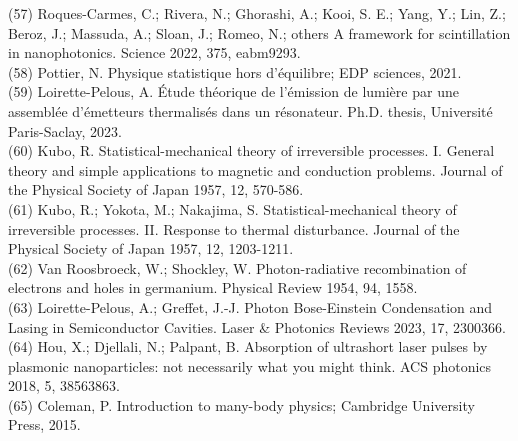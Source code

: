 \documentclass[10pt]{article}
\begin{document}
(57) Roques-Carmes, C.; Rivera, N.; Ghorashi, A.; Kooi, S. E.; Yang, Y.; Lin, Z.; Beroz, J.; Massuda, A.; Sloan, J.; Romeo, N.; others A framework for scintillation in nanophotonics. Science 2022, 375, eabm9293.\\
(58) Pottier, N. Physique statistique hors d'équilibre; EDP sciences, 2021.\\
(59) Loirette-Pelous, A. Étude théorique de l'émission de lumière par une assemblée d'émetteurs thermalisés dans un résonateur. Ph.D. thesis, Université Paris-Saclay, 2023.\\
(60) Kubo, R. Statistical-mechanical theory of irreversible processes. I. General theory and simple applications to magnetic and conduction problems. Journal of the Physical Society of Japan 1957, 12, 570-586.\\
(61) Kubo, R.; Yokota, M.; Nakajima, S. Statistical-mechanical theory of irreversible processes. II. Response to thermal disturbance. Journal of the Physical Society of Japan 1957, 12, 1203-1211.\\
(62) Van Roosbroeck, W.; Shockley, W. Photon-radiative recombination of electrons and holes in germanium. Physical Review 1954, 94, 1558.\\
(63) Loirette-Pelous, A.; Greffet, J.-J. Photon Bose-Einstein Condensation and Lasing in Semiconductor Cavities. Laser \& Photonics Reviews 2023, 17, 2300366.\\
(64) Hou, X.; Djellali, N.; Palpant, B. Absorption of ultrashort laser pulses by plasmonic nanoparticles: not necessarily what you might think. ACS photonics 2018, 5, 38563863.\\
(65) Coleman, P. Introduction to many-body physics; Cambridge University Press, 2015.
\end{document}
